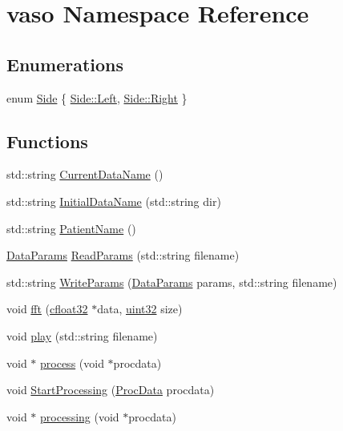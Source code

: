 \hypertarget{namespacevaso}{\section{vaso Namespace Reference}
\label{namespacevaso}
}
\subsection*{Enumerations}
\begin{DoxyCompactItemize}
\item 
enum \hyperlink{namespacevaso_a77c5d9704657d49d456f691ddd8abf7c}{Side} \{ \hyperlink{namespacevaso_a77c5d9704657d49d456f691ddd8abf7ca945d5e233cf7d6240f6b783b36a374ff}{Side\+::\+Left}, 
\hyperlink{namespacevaso_a77c5d9704657d49d456f691ddd8abf7ca92b09c7c48c520c3c55e497875da437c}{Side\+::\+Right}
 \}
\end{DoxyCompactItemize}
\subsection*{Functions}
\begin{DoxyCompactItemize}
\item 
std\+::string \hyperlink{namespacevaso_abab641a332f2e834dfcdf294c0429426}{Current\+Data\+Name} ()
\item 
std\+::string \hyperlink{namespacevaso_a38d8ffc663580ac23ac3fa9f673257f0}{Initial\+Data\+Name} (std\+::string dir)
\item 
std\+::string \hyperlink{namespacevaso_a21e264fa912f7ca3f50e7e412ba1582e}{Patient\+Name} ()
\item 
\hyperlink{structDataParams}{Data\+Params} \hyperlink{namespacevaso_ad97ffefae9a9b6ae48eba1103c0cb8e3}{Read\+Params} (std\+::string filename)
\item 
std\+::string \hyperlink{namespacevaso_aa17e0f380924c116f8d835f42de7187c}{Write\+Params} (\hyperlink{structDataParams}{Data\+Params} params, std\+::string filename)
\item 
void \hyperlink{namespacevaso_af74f08a8afd7967b6c2b3c2b0e5fb1e9}{fft} (\hyperlink{definitions_8hpp_a960be6b6614c08090c16574dba10a421}{cfloat32} $\ast$data, \hyperlink{definitions_8hpp_a1134b580f8da4de94ca6b1de4d37975e}{uint32} size)
\item 
void \hyperlink{namespacevaso_ae6ba895cfb9c97f341da9b17246f38a9}{play} (std\+::string filename)
\item 
void $\ast$ \hyperlink{namespacevaso_acd767ffd09e8d7323a0275e8f88a6de2}{process} (void $\ast$procdata)
\item 
void \hyperlink{namespacevaso_aec526a2735f71ef68cea3e00ae943edf}{Start\+Processing} (\hyperlink{structProcData}{Proc\+Data} procdata)
\item 
void $\ast$ \hyperlink{namespacevaso_ae553d67666b43a570bbb1753b2a624d2}{processing} (void $\ast$procdata)
\end{DoxyCompactItemize}
